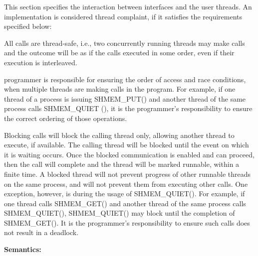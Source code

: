 This section specifies the interaction between \openshmem{} interfaces and the
user threads. An \openshmem{} implementation is considered thread complaint, if
it satisfies the requirements specified below:
                                      	
All \openshmem{} calls are thread-safe, i.e., two concurrently running threads
may make \openshmem{} calls and the outcome will be as if the calls executed in
some order, even if their execution is interleaved.


\openshmem{} programmer is responsible for ensuring the order of access and race
conditions, when multiple threads are making \openshmem{} calls in the
\openshmem{} program. For example, if one thread of a process is issuing
SHMEM\_PUT() and another thread of the same process calls SHMEM\_QUIET (), it is
the programmer's responsibility to ensure the correct ordering of those
operations.


Blocking \openshmem{} calls will block the calling thread only, allowing another
thread to execute, if available. The calling thread will be blocked until the
event on which it is waiting occurs. Once the blocked communication is enabled
and can proceed, then the call will complete and the thread will be marked
runnable, within a finite time. A blocked thread will not prevent progress of
other runnable threads on the same process, and will not prevent them from
executing other \openshmem{} calls. One exception, however, is during the usage
of SHMEM\_QUIET(). For example, if one thread calls SHMEM\_GET() and another
thread of the same process calls SHMEM\_QUIET(), SHMEM\_QUIET() may block until
the completion of SHMEM\_GET(). It is the programmer's responsibility to ensure
such calls does not result in a deadlock. 

{\bf Semantics:}

